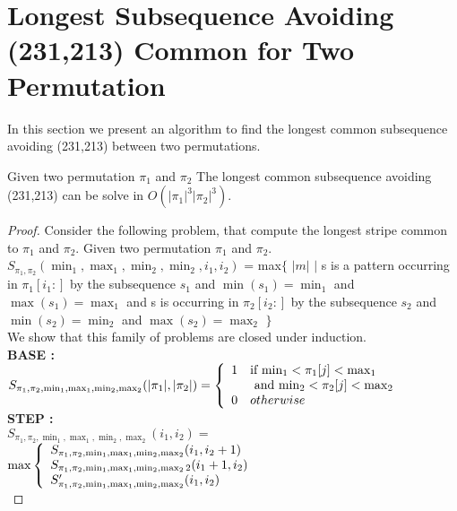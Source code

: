 \documentclass[a4paper]{llncs}
\begin{document}
	\section{Longest Subsequence Avoiding \\(231,213) Common for Two Permutation}
	
	In this section we present an algorithm to find 
	the longest common subsequence avoiding (231,213) 
	between two permutations.\\

	\begin{proposition}
	Given two permutation $\pi_1$ and $\pi_2$
	The longest common subsequence
	avoiding (231,213) can be solve in $O(|\pi_1|^3|\pi_2|^3)$.	
	\end{proposition}
	
	\begin{proof}
	Consider the following problem, 
	that compute the longest stripe common to $\pi_1$ and $\pi_2$.
	Given two permutation $\pi_1$ and $\pi_2$.\\
	
	$S_{\pi_1,\pi_2}(\min_1,\max_1,\min_2,\min_2,i_1,i_2)$
	= max$\{$ $|m|$ $|$ 
	s is a pattern occurring 
	in  $\pi_1[i_1:]$
	by the subsequence $s_1$ and $\min(s_1)=\min_1$ and $\max(s_1)=\max_1$
	and s is occurring
	in  $\pi_2[i_2:]$
	by the subsequence $s_2$ and $\min(s_2)=\min_2$ and $\max(s_2)=\max_2$	
	$\}$\\
	
	We show that this family of problems are closed under induction.\\


	\textbf{BASE :} \\
	$S_{\pi_1,\pi_2,\min_1,\max_1,\min_2,\max_2}(|\pi_1|,|\pi_2|) = \left\{ 
			\begin{array}{l l}
				1 & \text{if $\min_1<\pi_1[j]<\max_1$  
				}\\
				& \text{ and $\min_2<\pi_2[j]<\max_2$}\\
				0 & otherwise\\
			\end{array} \right. $\\	

	\textbf{STEP :} \\	
	
	$S_{\pi_1,\pi_2,\min_1,\max_1,\min_2,\max_2}(i_1,i_2) =$\\
	\indent $ \max \left\{ 
			\begin{array}{l l}
				S_{\pi_1,\pi_2,\min_1,\max_1,\min_2,\max_2}(i_1,i_2+1) \\
				S_{\pi_1,\pi_2,\min_1,\max_1,\min_2,\max_22}(i_1+1,i_2) \\
				S'_{\pi_1,\pi_2,\min_1,\max_1,\min_2,\max_2}(i_1,i_2)
			\end{array} \right. $\vspace{20pt}\\	
	

\end{proof}
\end{document}
